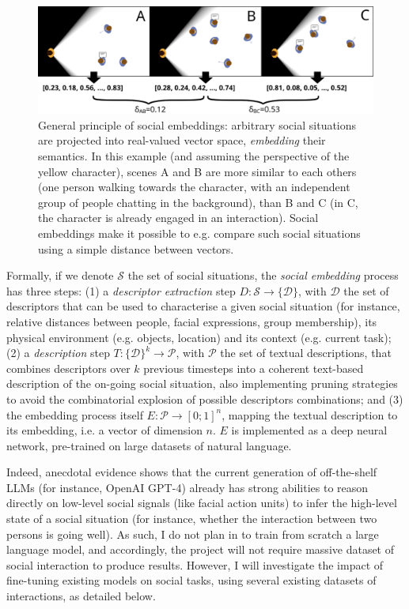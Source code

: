 \begin{figure}[H]
    \centering
    \includegraphics[width=0.9\linewidth]{figs/social-embeddings}
    \caption{General principle of social embeddings: arbitrary social situations
    are projected into real-valued vector space, \emph{embedding} their
    semantics. In this example (and assuming the perspective of the yellow
    character), scenes A and B  are more similar to each others (one person
    walking towards the character, with an independent group of people chatting
    in the background), than B and C (in C, the character is already engaged in
    an interaction).  Social embeddings make it possible to e.g. compare such
    social situations using a simple distance between vectors.}

    \label{fig:social-embeddings}
\end{figure}


Formally, if we denote $\mathcal{S}$ the set of social situations, the
\emph{social embedding} process has three steps: (1) a \emph{descriptor
extraction} step $D : \mathcal{S} \to \{\mathcal{D}\}$, with $\mathcal{D}$ the
set of descriptors that can be used to characterise a given social situation
(for instance, relative distances between people, facial expressions, group
membership), its physical environment (e.g. objects, location) and its context (e.g. current task); (2) a \emph{description} step $T: \{\mathcal{D}\}^k
\to \mathcal{P}$, with $\mathcal{P}$ the set of textual descriptions, that
combines descriptors over $k$ previous timesteps into a coherent text-based description
of the on-going social situation, also implementing pruning strategies to avoid
the combinatorial explosion of possible descriptors combinations; and (3) the embedding
process itself $E : \mathcal{P} \to [0;1]^n$, mapping the textual description to
its embedding, i.e.  a vector of dimension $n$. $E$ is implemented as a deep
neural network, pre-trained on large datasets of natural language.

Indeed, anecdotal evidence shows that the current generation of off-the-shelf
LLMs (for instance, OpenAI GPT-4) already has strong abilities to reason
directly on low-level social signals (like facial action units) to infer the
high-level state of a social situation (for instance, whether the interaction
between two persons is going well). As such, I do not plan in \project to train
from scratch a large language model, and accordingly, the project will not
require massive dataset of social interaction to produce results. However, I
will investigate the impact of fine-tuning existing models on social tasks,
using several existing datasets of interactions, as detailed below.

